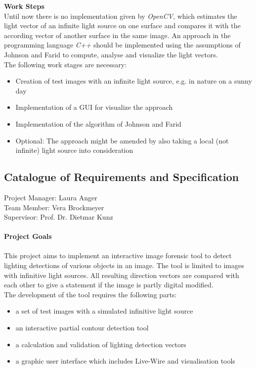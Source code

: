 \textbf{Work Steps} \\
Until now there is no implementation given by \textit{OpenCV}, which estimates the light vector of an infinite light source on one surface and compares it with the according vector of another surface in the same image. An approach in the programming language \textit{C++} should be implemented using the assumptions of Johnson and Farid \cite{Johnson} to compute, analyse and visualize the light vectors. \\The following work stages are necessary: 

\begin{itemize}
\item Creation of test images with an infinite light source, e.g. in nature on a sunny day 
\item Implementation of a GUI for visualize the approach
\item Implementation of the algorithm of Johnson and Farid \cite{Johnson}
\item Optional: The approach might be amended by also taking a local (not infinite) light source into consideration \cite{Johnson}
\end{itemize}


\subsection{Catalogue of Requirements and Specification} \label{sec:PMcatalogue}
Project Manager: Laura Anger \\
Team Member: Vera Brockmeyer \\
Supervisor: Prof. Dr. Dietmar Kunz\\ \\
\textbf{Project Goals}\\ \\
This project aims to implement an interactive image forensic tool to detect lighting detections of various objects in an image. The tool is limited to images with infinitive light sources. All resulting direction vectors are compared with each other to give a statement if the image is partly digital modified.\\
 
The development of the tool requires the following parts: 
\begin{itemize}
\item a set of test images with a simulated infinitive light source
\item an interactive partial contour detection tool 
\item a calculation and validation of lighting detection vectors 
\item a graphic user interface which includes Live-Wire and visualisation tools
\end{itemize}

